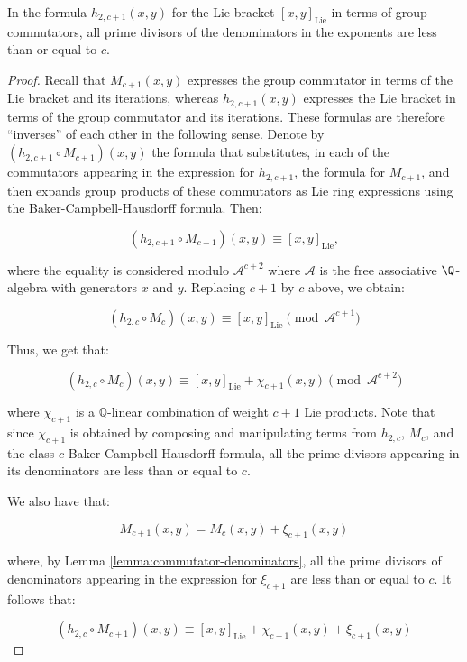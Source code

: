 \documentclass{ucetd}
\begin{document}
\begin{lemma}\label{lemma:lie-bracket-denominators}
  In the formula $h_{2,c + 1}(x,y)$ for the Lie bracket
  $[x,y]_{\text{Lie}}$ in terms of group commutators, all prime
  divisors of the denominators in the exponents are less than or equal
  to $c$.
\end{lemma}

\begin{proof}
  Recall that $M_{c+1}(x,y)$ expresses the group commutator in terms
  of the Lie bracket and its iterations, whereas $h_{2,c + 1}(x,y)$
  expresses the Lie bracket in terms of the group commutator and its
  iterations. These formulas are therefore ``inverses'' of each other
  in the following sense. Denote by $(h_{2,c + 1} \circ M_{c +
    1})(x,y)$ the formula that substitutes, in each of the commutators
  appearing in the expression for $h_{2,c + 1}$, the formula for
  $M_{c+1}$, and then expands group products of these commutators as
  Lie ring expressions using the Baker-Campbell-Hausdorff
  formula. Then:

  $$(h_{2,c+1} \circ M_{c+1})(x,y) \equiv [x,y]_{\text{Lie}},$$

  where the equality is considered modulo $\mathcal{A}^{c+2}$ where
  $\mathcal{A}$ is the free associative $\Q$-algebra with generators
  $x$ and $y$. Replacing $c + 1$ by $c$ above, we obtain:

  $$(h_{2,c} \circ M_c)(x,y) \equiv [x,y]_{\text{Lie}} \pmod{\mathcal{A}^{c+1}}$$

  Thus, we get that:

  $$(h_{2,c} \circ M_{c})(x,y) \equiv [x,y]_{\text{Lie}} + \chi_{c+1}(x,y) \pmod{\mathcal{A}^{c+2}}$$
 
 where $\chi_{c+1}$ is a $\mathbb{Q}$-linear combination of weight $c
 + 1$ Lie products. Note that since $\chi_{c+1}$ is obtained by
 composing and manipulating terms from $h_{2,c}$, $M_{c}$, and the
 class $c$ Baker-Campbell-Hausdorff formula, all the prime divisors
 appearing in its denominators are less than or equal to $c$.

 We also have that:

 $$M_{c+1}(x,y) = M_c(x,y) + \xi_{c+1}(x,y)$$

 where, by Lemma \ref{lemma:commutator-denominators}, all the prime
 divisors of denominators appearing in the expression for $\xi_{c+1}$ are
 less than or equal to $c$. It follows that:

 $$(h_{2,c} \circ M_{c+1})(x,y) \equiv [x,y]_{\text{Lie}} + \chi_{c+1}(x,y) + \xi_{c+1}(x,y)$$


\end{proof}
\end{document}
